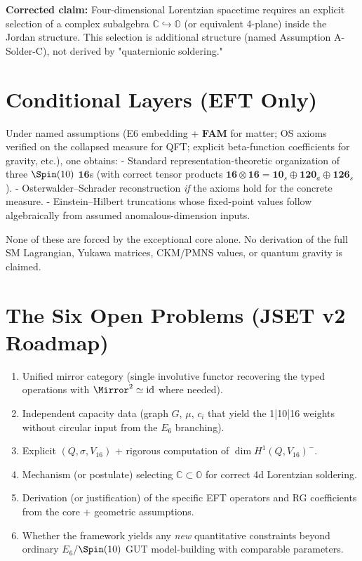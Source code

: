 \documentclass[11pt]{article}
\begin{document}
\textbf{Corrected claim:} Four-dimensional Lorentzian spacetime requires an explicit selection of a complex subalgebra $\mathbb{C} \hookrightarrow \mathbb{O}$ (or equivalent 4-plane) inside the Jordan structure. This selection is additional structure (named Assumption A-Solder-C), not derived by "quaternionic soldering."

\section*{Conditional Layers (EFT Only)}

Under named assumptions (E6 embedding + \textbf{FAM} for matter; OS axioms verified on the collapsed measure for QFT; explicit beta-function coefficients for gravity, etc.), one obtains:
- Standard representation-theoretic organization of three $\Spin(10)$ $\mathbf{16}$s (with correct tensor products $\mathbf{16}\otimes\mathbf{16} = \mathbf{10}_s \oplus \mathbf{120}_a \oplus \mathbf{126}_s$).
- Osterwalder–Schrader reconstruction \emph{if} the axioms hold for the concrete measure.
- Einstein–Hilbert truncations whose fixed-point values follow algebraically from assumed anomalous-dimension inputs.

None of these are forced by the exceptional core alone. No derivation of the full SM Lagrangian, Yukawa matrices, CKM/PMNS values, or quantum gravity is claimed.

\section*{The Six Open Problems (JSET v2 Roadmap)}

\begin{enumerate}[leftmargin=*]
\item Unified mirror category (single involutive functor recovering the typed operations with $\Mirror^2\simeq\mathrm{id}$ where needed).
\item Independent capacity data (graph $G$, $\mu$, $c_i$ that yield the 1|10|16 weights without circular input from the $E_6$ branching).
\item Explicit $(Q,\sigma,V_{16})$ + rigorous computation of $\dim H^1(Q,V_{16})^{-}$.
\item Mechanism (or postulate) selecting $\mathbb{C}\subset\mathbb{O}$ for correct 4d Lorentzian soldering.
\item Derivation (or justification) of the specific EFT operators and RG coefficients from the core + geometric assumptions.
\item Whether the framework yields any \emph{new} quantitative constraints beyond ordinary $E_6$/$\Spin(10)$ GUT model-building with comparable parameters.
\end{enumerate}
\end{document}
